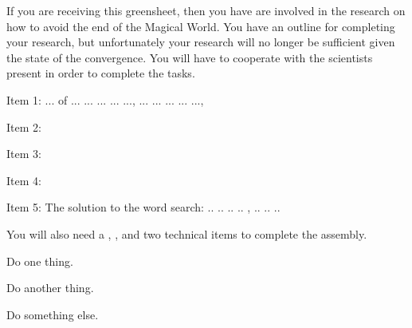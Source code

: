 \documentclass[green]{guildcamp3}
\begin{document}
\name{\gSaveTheWorldMages{}}






If you are receiving this greensheet, then you have are involved in the research on how to avoid the end of the Magical World. You have an outline for completing your research, but unfortunately your research will no longer be sufficient given the state of the convergence. You will have to cooperate with the scientists present in order to complete the tasks. 

Item 1: ... of ... ... ... ... ..., ... ... ... ... ...,

Item 2:

Item 3:

Item 4:

Item 5: The solution to the word search: .. .. .. ..  ,  .. .. ..



You will also need a \iCauldron{}, \iPlumbicRod{}, and two technical items to complete the assembly. 


\begin{enum}[Directions]
  \item Do one thing.
  \item Do another thing.
  \item Do something else.
\end{enum}
\end{document}
